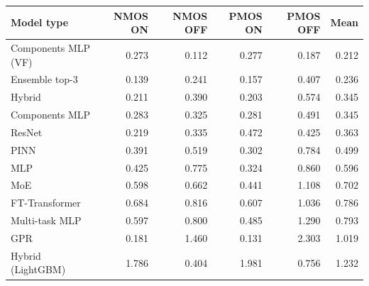 \begin{tabular}{lrrrrr}
\toprule
Model type & NMOS ON & NMOS OFF & PMOS ON & PMOS OFF & Mean \\
\midrule
Components MLP (VF) & 0.273 & 0.112 & 0.277 & 0.187 & 0.212 \\
Ensemble top-3 & 0.139 & 0.241 & 0.157 & 0.407 & 0.236 \\
Hybrid & 0.211 & 0.390 & 0.203 & 0.574 & 0.345 \\
Components MLP & 0.283 & 0.325 & 0.281 & 0.491 & 0.345 \\
ResNet & 0.219 & 0.335 & 0.472 & 0.425 & 0.363 \\
PINN & 0.391 & 0.519 & 0.302 & 0.784 & 0.499 \\
MLP & 0.425 & 0.775 & 0.324 & 0.860 & 0.596 \\
MoE & 0.598 & 0.662 & 0.441 & 1.108 & 0.702 \\
FT-Transformer & 0.684 & 0.816 & 0.607 & 1.036 & 0.786 \\
Multi-task MLP & 0.597 & 0.800 & 0.485 & 1.290 & 0.793 \\
GPR & 0.181 & 1.460 & 0.131 & 2.303 & 1.019 \\
Hybrid (LightGBM) & 1.786 & 0.404 & 1.981 & 0.756 & 1.232 \\
\bottomrule
\end{tabular}
